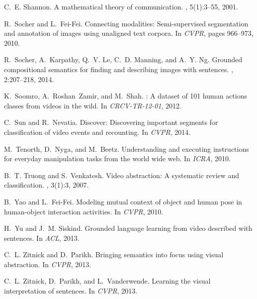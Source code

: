 \documentclass[10pt,twocolumn,letterpaper]{article}
\begin{document}
\begin{thebibliography}{10}
C.~E. Shannon.
\newblock A mathematical theory of communication.
,
  5(1):3--55, 2001.

R.~Socher and L.~Fei-Fei.
\newblock Connecting modalities: Semi-supervised segmentation and annotation of
  images using unaligned text corpora.
\newblock In {\em CVPR}, pages 966--973, 2010.

R.~Socher, A.~Karpathy, Q.~V. Le, C.~D. Manning, and A.~Y. Ng.
\newblock Grounded compositional semantics for finding and describing images
  with sentences.
, 2:207--218, 2014.

K.~Soomro, A.~Roshan~Zamir, and M.~Shah.
: A dataset of 101 human actions classes from videos in the
  wild.
\newblock In {\em CRCV-TR-12-01}, 2012.

C.~Sun and R.~Nevatia.
\newblock Discover: Discovering important segments for classification of video
  events and recounting.
\newblock In {\em CVPR}, 2014.

M.~Tenorth, D.~Nyga, and M.~Beetz.
\newblock Understanding and executing instructions for everyday manipulation
  tasks from the world wide web.
\newblock In {\em ICRA}, 2010.

B.~T. Truong and S.~Venkatesh.
\newblock Video abstraction: A systematic review and classification.
, 3(1):3, 2007.

B.~Yao and L.~Fei-Fei.
\newblock Modeling mutual context of object and human pose in human-object
  interaction activities.
\newblock In {\em CVPR}, 2010.

H.~Yu and J.~M. Siskind.
\newblock Grounded language learning from video described with sentences.
\newblock In {\em ACL}, 2013.

C.~L. Zitnick and D.~Parikh.
\newblock Bringing semantics into focus using visual abstraction.
\newblock In {\em CVPR}, 2013.

C.~L. Zitnick, D.~Parikh, and L.~Vanderwende.
\newblock Learning the visual interpretation of sentences.
\newblock In {\em CVPR}, 2013.

\end{thebibliography}
\end{document}
